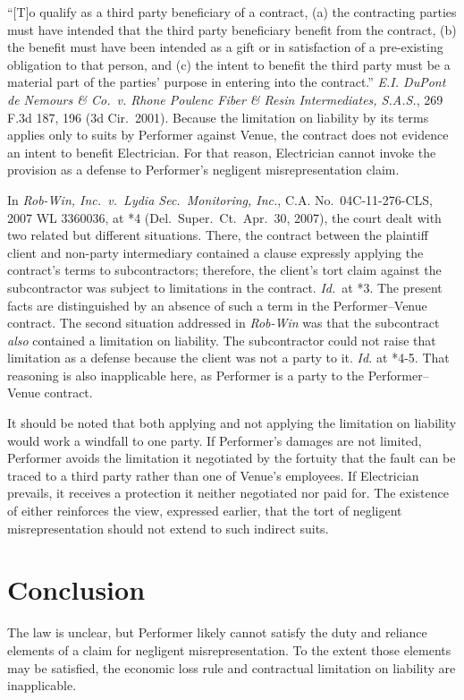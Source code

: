 \documentclass[
  12pt,
  letterpaper,
]{scrartcl}
\begin{document}
``{[}T{]}o qualify as a third party beneficiary of a contract, (a) the
contracting parties must have intended that the third party beneficiary
benefit from the contract, (b) the benefit must have been intended as a
gift or in satisfaction of a pre-existing obligation to that person, and
(c) the intent to benefit the third party must be a material part of the
parties' purpose in entering into the contract.'' \emph{E.I. DuPont de
Nemours \& Co.~v. Rhone Poulenc Fiber \& Resin Intermediates, S.A.S.},
269 F.3d 187, 196 (3d Cir.~2001). Because the limitation on liability by
its terms applies only to suits by Performer against Venue, the contract
does not evidence an intent to benefit Electrician. For that reason,
Electrician cannot invoke the provision as a defense to Performer's
negligent misrepresentation claim.

In \emph{Rob-Win, Inc.~v.~Lydia Sec.~Monitoring, Inc.}, C.A.
No.~04C-11-276-CLS, 2007 WL 3360036, at *4 (Del.~Super.~Ct.~Apr.~30, 2007), the court dealt with two related but
different situations. There, the contract between the plaintiff client
and non-party intermediary contained a clause expressly applying the
contract's terms to subcontractors; therefore, the client's tort claim
against the subcontractor was subject to limitations in the contract.
\emph{Id.}~at *3. The present facts are distinguished by an absence of such a
term in the Performer--Venue contract. The second situation addressed in
\emph{Rob-Win} was that the subcontract \emph{also} contained a
limitation on liability. The subcontractor could not raise that
limitation as a defense because the client was not a party to it.
\emph{Id.} at *4-5. That reasoning is also inapplicable here, as
Performer is a party to the Performer--Venue contract.

It should be noted that both applying and not applying the limitation on
liability would work a windfall to one party. If Performer's damages are
not limited, Performer avoids the limitation it negotiated by the
fortuity that the fault can be traced to a third party rather than one
of Venue's employees. If Electrician prevails, it receives a protection
it neither negotiated nor paid for. The existence of either reinforces
the view, expressed earlier, that the tort of negligent
misrepresentation should not extend to such indirect suits.

\hypertarget{conclusion}{%
\section{Conclusion}\label{conclusion}}

The law is unclear, but Performer likely cannot satisfy the duty and
reliance elements of a claim for negligent misrepresentation. To the
extent those elements may be satisfied, the economic loss rule and
contractual limitation on liability are inapplicable.
\end{document}
